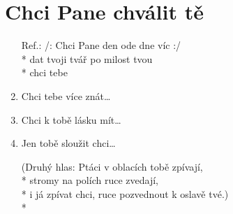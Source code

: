 \section{Chci Pane chválit tě}            %
\begin{enumerate}
\item[Ref.:]   /: Chci Pane  den ode dne víc :/ \\*
dat tvoji tvář po milost tvou \\*
chci tebe  
\item Chci tebe více znát… 
\item Chci     k tobě lásku mít… 
\item Jen tobě sloužit chci…
\item[] (Druhý hlas: Ptáci v oblacích tobě zpívají, \\*
stromy na polích ruce zvedají, \\*
i já zpívat chci, ruce pozvednout k oslavě tvé.) \\*
\end{enumerate}
